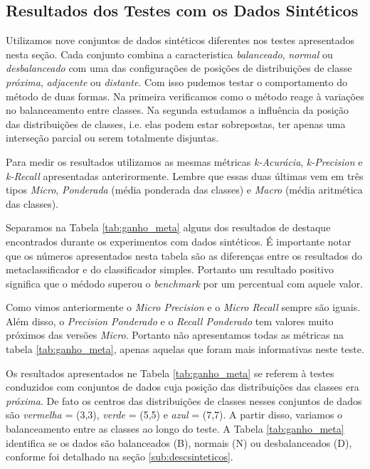 \subsection{Resultados dos Testes com os Dados Sintéticos}

Utilizamos nove conjuntos de dados sintéticos diferentes nos testes apresentados nesta seção.
Cada conjunto combina a caracteristica \textit{balanceado}, \textit{normal} ou \textit{ desbalanceado} com uma das configurações de posições de distribuições de classe \textit{próxima}, \textit{adjacente} ou \textit{distante}.
Com isso pudemos testar o comportamento do método de duas formas.
Na primeira verificamos como o método reage à variações no balanceamento entre classes.
Na segunda estudamos a influência da posição das distribuições de classes, i.e. elas podem estar sobrepostas, ter apenas uma interseção parcial ou serem totalmente disjuntas.

Para medir os resultados utilizamos as mesmas métricas \textit{k-Acurácia}, \textit{k-Precision} e \textit{k-Recall} apresentadas anterirormente.
Lembre que essas duas últimas vem em três tipos \textit{Micro}, \textit{Ponderada} (média ponderada das classes) e \textit{Macro} (média aritmética das classes).

Separamos na Tabela \ref{tab:ganho_meta} alguns dos resultados de destaque encontrados durante os experimentos com dados sintéticos.
É importante notar que os números apresentados nesta tabela são as diferenças entre os resultados do metaclassificador e do classificador simples.
Portanto um resultado positivo significa que o médodo superou o \textit{benchmark} por um percentual com aquele valor.

Como vimos anteriormente o \textit{Micro Precision} e o \textit{Micro Recall} sempre são iguais.
Além disso, o \textit{Precision Ponderado} e o \textit{Recall Ponderado} tem valores muito próximos das versões \textit{Micro}.
Portanto não apresentamos todas as métricas na tabela \ref{tab:ganho_meta}, apenas aquelas que foram mais informativas neste teste.

Os resultados apresentados ne Tabela \ref{tab:ganho_meta} se referem à testes conduzidos com conjuntos de dados cuja posição das distribuições das classes era \textit{próxima}.
De fato os centros das distribuições de classes nesses conjuntos de dados são \textit{vermelha} = (3,3), \textit{verde} = (5,5) e \textit{azul} = (7,7).
A partir disso, variamos o balanceamento entre as classes ao longo do teste.
A Tabela \ref{tab:ganho_meta} identifica se os dados são balanceados (B), normais (N) ou desbalanceados (D), conforme foi detalhado na seção \ref{sub:descsinteticos}.

